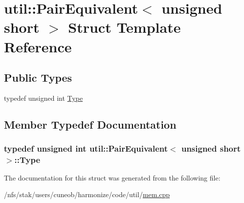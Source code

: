 \hypertarget{structutil_1_1PairEquivalent_3_01unsigned_01short_01_4}{\section{util\-:\-:Pair\-Equivalent$<$ unsigned short $>$ Struct Template Reference}
\label{structutil_1_1PairEquivalent_3_01unsigned_01short_01_4}
}
\subsection*{Public Types}
\begin{DoxyCompactItemize}
\item 
typedef unsigned int \hyperlink{structutil_1_1PairEquivalent_3_01unsigned_01short_01_4_ac26f153bff321d1d62f7c04264c2edbf}{Type}
\end{DoxyCompactItemize}


\subsection{Member Typedef Documentation}
\hypertarget{structutil_1_1PairEquivalent_3_01unsigned_01short_01_4_ac26f153bff321d1d62f7c04264c2edbf}{
\subsubsection[{Type}]{\setlength{\rightskip}{0pt plus 5cm}typedef unsigned int {\bf util\-::\-Pair\-Equivalent}$<$ unsigned short $>$\-::{\bf Type}}}\label{structutil_1_1PairEquivalent_3_01unsigned_01short_01_4_ac26f153bff321d1d62f7c04264c2edbf}


The documentation for this struct was generated from the following file\-:\begin{DoxyCompactItemize}
\item 
/nfs/stak/users/cuneob/harmonize/code/util/\hyperlink{mem_8cpp}{mem.\-cpp}\end{DoxyCompactItemize}
